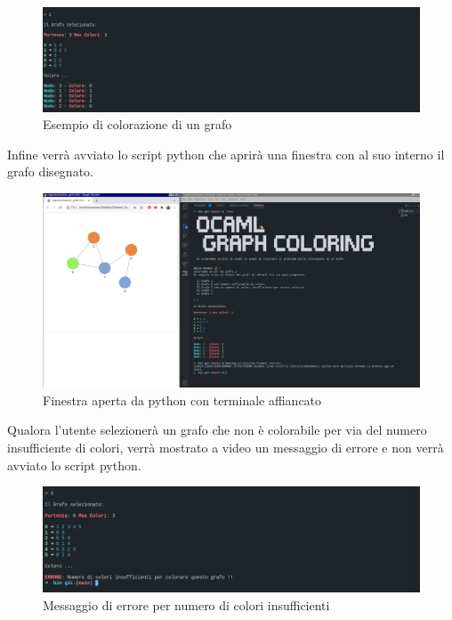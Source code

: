 \begin{figure}[H]
	\centering
	\includegraphics[width=.8\textwidth]{img/grafo1bin.png}
	\caption{Esempio di colorazione di un grafo}
\end{figure}

Infine verrà avviato lo script python che aprirà una finestra con al suo interno il grafo disegnato.

\begin{figure}[H]
	\centering
	\includegraphics[width=.7\textwidth]{img/termgrafo.png}
	\caption{Finestra aperta da python con terminale affiancato}
\end{figure}

Qualora l'utente selezionerà un grafo che non è colorabile per via del numero insufficiente di colori, verrà mostrato a video un messaggio di errore e non verrà avviato lo script python.

\begin{figure}[H]
	\centering
	\includegraphics[width=.7\textwidth]{img/errore.png}
	\caption{Messaggio di errore per numero di colori insufficienti}
\end{figure}
